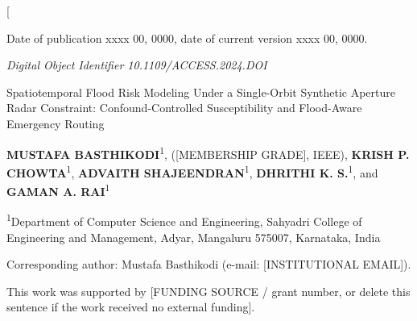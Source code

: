 \documentclass[10pt,twocolumn]{article}
\begin{document}
\thispagestyle{accessfirst}
\twocolumn[
\begin{@twocolumnfalse}
\vspace*{-2pt}

{\fontsize{7.5}{9}\selectfont
Date of publication xxxx 00, 0000, date of current version xxxx 00, 0000.\par}
{\fontsize{6}{8}\selectfont\itshape
Digital Object Identifier 10.1109/ACCESS.2024.DOI\par}

\vspace{18pt}

{\helv\fontsize{22}{25}\bfseries\color{accessblue}\raggedright
Spatiotemporal Flood Risk Modeling Under a Single-Orbit Synthetic Aperture Radar Constraint: Confound-Controlled Susceptibility and Flood-Aware Emergency Routing\par}

\vspace{12pt}

\begin{minipage}{\dimexpr\textwidth-0.958in\relax}
{\helv\fontsize{10}{12}\selectfont\raggedright
\textbf{MUSTAFA BASTHIKODI}\textsuperscript{1}, ([MEMBERSHIP GRADE], IEEE),
\textbf{KRISH P. CHOWTA}\textsuperscript{1},
\textbf{ADVAITH SHAJEENDRAN}\textsuperscript{1},
\textbf{DHRITHI K. S.}\textsuperscript{1},
and \textbf{GAMAN A. RAI}\textsuperscript{1}\par}

\vspace{5pt}

{\fontsize{7.5}{9}\selectfont\raggedright
\textsuperscript{1}Department of Computer Science and Engineering, Sahyadri College of Engineering and Management, Adyar, Mangaluru 575007, Karnataka, India

Corresponding author: Mustafa Basthikodi (e-mail: [INSTITUTIONAL EMAIL]).\par}
\end{minipage}

\vspace{10pt}

{\fontsize{7}{9}\selectfont
This work was supported by [FUNDING SOURCE / grant number, or delete this sentence if the work received no external funding].\par}

\vspace{12pt}


\end{@twocolumnfalse}
\end{document}
